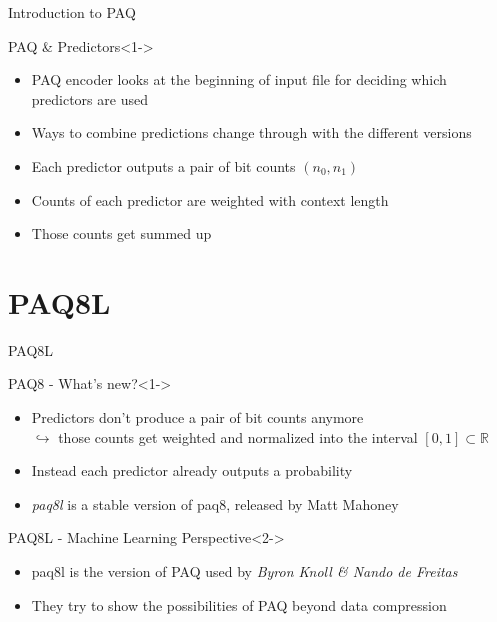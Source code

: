 \documentclass[11pt,usenames,dvipsnames]{beamer}
\begin{document}
\begin{frame}{Introduction to PAQ}
		\begin{exampleblock}{PAQ \& Predictors}<1->
		\begin{itemize}
			\item PAQ encoder looks at the beginning of input file for deciding which predictors are used
			\item Ways to combine predictions change through with the different versions
			\item Each predictor outputs a pair of bit counts $\left(n_0 , n_1\right)$ 
			\item Counts of each predictor are weighted with context length
		 	\item Those counts get summed up 
		\end{itemize}

	\end{exampleblock}
\end{frame}

\section{PAQ8L}
\begin{frame}{PAQ8L}
	\begin{exampleblock}{PAQ8 - What's new?}<1->
		\begin{itemize}
			\item Predictors don't produce a pair of bit counts anymore\\
			$\hookrightarrow$ those counts get weighted and normalized into the interval $[0,1]\subset\mathbb{R}$
			\item Instead  each predictor already outputs a probability
			\item \textit{paq8l} is a stable version of paq8, released by Matt Mahoney
		\end{itemize}
	\end{exampleblock}
	
		\begin{alertblock}{PAQ8L - Machine Learning Perspective}<2->
		\begin{itemize}
			\item paq8l is the version of PAQ used by \textit{Byron Knoll \& Nando de Freitas}
			\item They try to show the possibilities of PAQ beyond data compression
		\end{itemize}
	\end{alertblock}
\end{frame}
\end{document}
